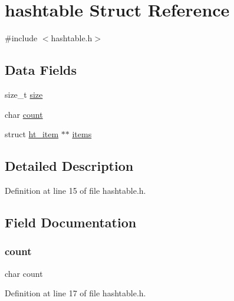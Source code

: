 \hypertarget{structhashtable}{}\section{hashtable Struct Reference}
\label{structhashtable}


{\ttfamily \#include $<$hashtable.\+h$>$}

\subsection*{Data Fields}
\begin{DoxyCompactItemize}
\item 
size\+\_\+t \mbox{\hyperlink{structhashtable_a854352f53b148adc24983a58a1866d66}{size}}
\item 
char \mbox{\hyperlink{structhashtable_a783b4b3f28a47e4200d0cd5522f99009}{count}}
\item 
struct \mbox{\hyperlink{structht__item}{ht\+\_\+item}} $\ast$$\ast$ \mbox{\hyperlink{structhashtable_a8a3d7e001ac614584cad5d1ed7f83881}{items}}
\end{DoxyCompactItemize}


\subsection{Detailed Description}


Definition at line 15 of file hashtable.\+h.



\subsection{Field Documentation}
\mbox{\label{structhashtable_a783b4b3f28a47e4200d0cd5522f99009}} 
\subsubsection{\texorpdfstring{count}{count}}
{\footnotesize\ttfamily char count}



Definition at line 17 of file hashtable.\+h.

\mbox{\label{structhashtable_a8a3d7e001ac614584cad5d1ed7f83881}} 
